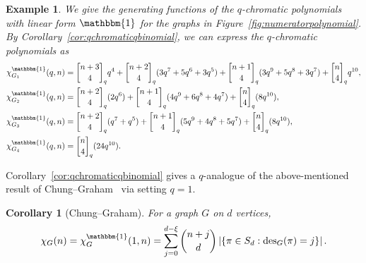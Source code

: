 \documentclass[11pt]{amsart}
\newtheorem{corollary}[theorem]{Corollary}
\newtheorem{exam}{Example}
\newenvironment{example}{\begin{exam}\sf}{\end{exam}}
\newcommand{\desnum}{\mathrm{des}}
\newcommand{\qbinom}[2]{\genfrac[]{0pt}{}{#1}{#2}_q}
\begin{document}
\begin{example}\label{ex:qchromaticgenfunction}
    We give the generating functions of the $q$-chromatic polynomials with linear form $\mathbbm{1}$ for the
graphs in Figure~\ref{fig:numeratorpolynomial}. 
    By Corollary~\ref{cor:qchromaticqbinomial}, we can express the $q$-chromatic polynomials as
\begin{align*}
        \chi_{G_1}^\mathbbm{1}(q,n) &= \qbinom{n+3}{4} q^4 + \qbinom{n+2}{4} (3q^7+5q^6+3q^5) + \qbinom{n+1}{4} (3 q^9 + 5 q^8+3 q^7) + \qbinom{n}{4} q^{10},
    \\
        \chi_{G_2}^\mathbbm{1}(q,n) &=\qbinom{n+2}{4} (2q^6) + \qbinom{n+1}{4} (4 q^9+6q^8+4q^7) + \qbinom{n}{4} (8 q^{10}),
    \\
        \chi_{G_3}^\mathbbm{1}(q,n)  &= \qbinom{n+2}{4} (q^7+q^5) + \qbinom{n+1}{4} (5q^9+4q^8+5q^7) + \qbinom{n}{4} (8 q^{10}),
    \\
        \chi_{G_4}^\mathbbm{1}(q,n)  &= \qbinom{n}{4} (24 q^{10}).
\end{align*} 
\end{example}

Corollary~\ref{cor:qchromaticqbinomial} gives a $q$-analogue of the above-mentioned result of
Chung--Graham~\cite{chunggrahamcoverpol} via setting $q=1$.
\begin{corollary}[Chung--Graham]\label{cor:chunggraham}
    For a graph $G$ on $d$ vertices,
    \[
        \chi_G(n) = \chi^\mathbbm{1}_G(1,n) = \sum_{j=0}^{d-\xi} \binom{n+j}{d} \left|\{ \pi \in S_d :
\desnum_G(\pi)=j\} \right|.
    \] 
\end{corollary}
\end{document}
